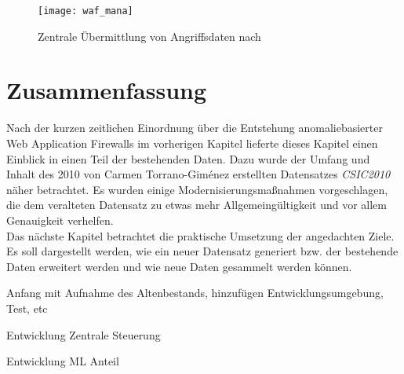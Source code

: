 \begin{figure}[ht]
  \begin{center}
    \texttt{[image: waf\_mana]}
    \caption{Zentrale Übermittlung von Angriffsdaten nach~\cite{Manaseer2018}}
    \label{fig.topten}
  \end{center}
\end{figure}



\section{Zusammenfassung}

Nach der kurzen zeitlichen Einordnung über die Entstehung anomaliebasierter Web Application Firewalls im vorherigen Kapitel lieferte dieses Kapitel einen Einblick in einen Teil der bestehenden Daten. Dazu wurde der Umfang und Inhalt des 2010 von Carmen Torrano-Giménez erstellten Datensatzes \emph{CSIC2010} näher betrachtet. Es wurden einige Modernisierungsmaßnahmen vorgeschlagen, die dem veralteten Datensatz zu etwas mehr Allgemeingültigkeit und vor allem Genauigkeit verhelfen.\\

Das nächste Kapitel betrachtet die praktische Umsetzung der angedachten Ziele. Es soll dargestellt werden, wie ein neuer Datensatz generiert bzw. der bestehende Daten erweitert werden und wie neue Daten gesammelt werden können. 

\begin{neu}
  Anfang mit Aufnahme des Altenbestands, hinzufügen Entwicklungsumgebung, Test, etc

  Entwicklung Zentrale Steuerung

  Entwicklung ML Anteil
\end{neu}
